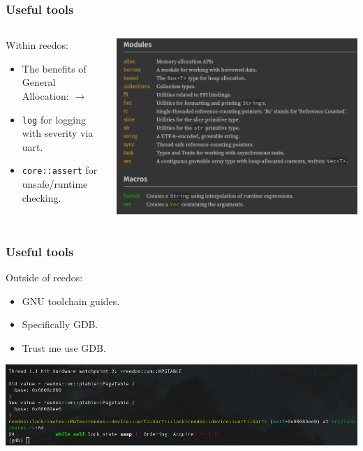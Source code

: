 \documentclass{beamer}
\begin{document}
\begin{frame}[fragile]
  \frametitle{Useful tools}
  \begin{columns}
    \begin{column}{0.5\textwidth}
      Within reedos:
      \begin{itemize}
      \item The benefits of General Allocation: $\rightarrow$\\
      \item \verb`log` for logging with severity via uart.\\
      \item \verb`core::assert` for unsafe/runtime checking.
      \end{itemize}
    \end{column}
    \begin{column}{0.5\textwidth}
      \includegraphics[width=\textwidth]{rustalloc.png}
    \end{column}
  \end{columns}
\end{frame}

\begin{frame}[fragile]
  \frametitle{Useful tools}
  Outside of reedos:
  \begin{itemize}
  \item GNU toolchain guides.\\
  \item Specifically GDB.\\
  \item Trust me use GDB.
  \end{itemize}
  \vspace{\baselineskip}
  \includegraphics[width=\textwidth]{gdberror.png}
\end{frame}
\end{document}
